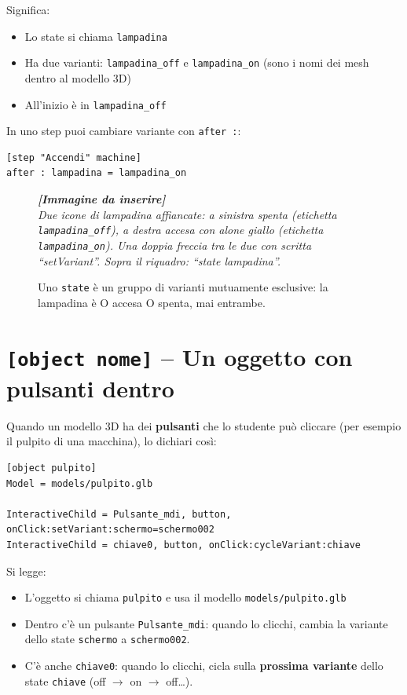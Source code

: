 ﻿\documentclass[a4paper,12pt,oneside]{book}
\newcommand{\kw}[1]{\texttt{\color{keycolor}#1}}
\newcommand{\imgph}[2]{%
  \begin{tcolorbox}[colback=cvtlightblue!30,colframe=cvtblue!40,%
    width=#1,halign=center,valign=center,height=5cm,boxrule=0.5pt,arc=3pt]%
    \textcolor{cvtgray}{\itshape\footnotesize\textbf{[Immagine da inserire]}\\[3pt]#2}%
  \end{tcolorbox}}
\begin{document}
Significa:
\begin{itemize}
  \item Lo state si chiama \texttt{lampadina}
  \item Ha due varianti: \texttt{lampadina\_off} e \texttt{lampadina\_on}
        (sono i nomi dei mesh dentro al modello 3D)
  \item All'inizio è in \texttt{lampadina\_off}
\end{itemize}

In uno step puoi cambiare variante con \kw{after :}:

\begin{lstlisting}
[step "Accendi" machine]
after : lampadina = lampadina_on
\end{lstlisting}

\begin{figure}[H]
  \centering
  \imgph{11cm}{Due icone di lampadina affiancate: a sinistra spenta (etichetta \texttt{lampadina\_off}), a destra accesa con alone giallo (etichetta \texttt{lampadina\_on}). Una doppia freccia tra le due con scritta ``setVariant''. Sopra il riquadro: ``state lampadina''.}
  \caption{Uno \texttt{state} è un gruppo di varianti mutuamente esclusive: la lampadina è O accesa O spenta, mai entrambe.}
  \label{fig:state-lampadina}
\end{figure}

\section{\texttt{[object nome]} -- Un oggetto con pulsanti dentro}

Quando un modello 3D ha dei \textbf{pulsanti} che lo studente può cliccare
(per esempio il pulpito di una macchina), lo dichiari così:

\begin{lstlisting}
[object pulpito]
Model = models/pulpito.glb

InteractiveChild = Pulsante_mdi, button, onClick:setVariant:schermo=schermo002
InteractiveChild = chiave0, button, onClick:cycleVariant:chiave
\end{lstlisting}

Si legge:
\begin{itemize}
  \item L'oggetto si chiama \texttt{pulpito} e usa il modello
        \texttt{models/pulpito.glb}
  \item Dentro c'è un pulsante \texttt{Pulsante\_mdi}: quando lo clicchi, cambia
        la variante dello state \texttt{schermo} a \texttt{schermo002}.
  \item C'è anche \texttt{chiave0}: quando lo clicchi, cicla
        sulla \textbf{prossima variante} dello state \texttt{chiave} (off
        $\rightarrow$ on $\rightarrow$ off\ldots).
\end{itemize}
\end{document}
